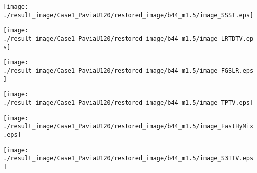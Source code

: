\begin{figure*}[t]
\begin{center}
		\begin{minipage}{0.125\hsize}
			\centerline{\hspace{\hsize}} %
		\end{minipage}
		\begin{minipage}{0.125\hsize}
			\centerline{\texttt{[image: ./result\_image/Case1\_PaviaU120/restored\_image/b44\_m1.5/image\_SSST.eps]}} %
		\end{minipage}
		\begin{minipage}{0.125\hsize}
			\centerline{\texttt{[image: ./result\_image/Case1\_PaviaU120/restored\_image/b44\_m1.5/image\_LRTDTV.eps]}} %
		\end{minipage}
		\begin{minipage}{0.125\hsize}
			\centerline{\texttt{[image: ./result\_image/Case1\_PaviaU120/restored\_image/b44\_m1.5/image\_FGSLR.eps]}} %
		\end{minipage}
		\begin{minipage}{0.125\hsize}
			\centerline{\texttt{[image: ./result\_image/Case1\_PaviaU120/restored\_image/b44\_m1.5/image\_TPTV.eps]}} %
		\end{minipage}
		\begin{minipage}{0.125\hsize}
			\centerline{\texttt{[image: ./result\_image/Case1\_PaviaU120/restored\_image/b44\_m1.5/image\_FastHyMix.eps]}} %
		\end{minipage}
		\begin{minipage}{0.125\hsize}
			\centerline{\texttt{[image: ./result\_image/Case1\_PaviaU120/restored\_image/b44\_m1.5/image\_S3TTV.eps]}} %
		\end{minipage}
		\begin{minipage}{0.050\hsize}
			\centerline{\hspace{\hsize}} %
		\end{minipage}
		
		\vspace{1mm}
		

\end{center}
\end{figure*}

